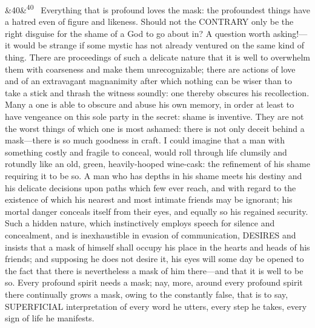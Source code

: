 \documentclass[12pt]{article}
\newcommand{\para}[1][]{\par\noindent\ifx&#1&\else\textsuperscript{\footnotesize #1}~\fi}
\begin{document}
\para[40] Everything that is profound loves the mask: the profoundest things have a hatred even of figure and likeness. Should not the CONTRARY only be the right disguise for the shame of a God to go about in? A question worth asking!---it would be strange if some mystic has not already ventured on the same kind of thing. There are proceedings of such a delicate nature that it is well to overwhelm them with coarseness and make them unrecognizable; there are actions of love and of an extravagant magnanimity after which nothing can be wiser than to take a stick and thrash the witness soundly: one thereby obscures his recollection. Many a one is able to obscure and abuse his own memory, in order at least to have vengeance on this sole party in the secret: shame is inventive. They are not the worst things of which one is most ashamed: there is not only deceit behind a mask---there is so much goodness in craft. I could imagine that a man with something costly and fragile to conceal, would roll through life clumsily and rotundly like an old, green, heavily-hooped wine-cask: the refinement of his shame requiring it to be so. A man who has depths in his shame meets his destiny and his delicate decisions upon paths which few ever reach, and with regard to the existence of which his nearest and most intimate friends may be ignorant; his mortal danger conceals itself from their eyes, and equally so his regained security. Such a hidden nature, which instinctively employs speech for silence and concealment, and is inexhaustible in evasion of communication, DESIRES and insists that a mask of himself shall occupy his place in the hearts and heads of his friends; and supposing he does not desire it, his eyes will some day be opened to the fact that there is nevertheless a mask of him there---and that it is well to be so. Every profound spirit needs a mask; nay, more, around every profound spirit there continually grows a mask, owing to the constantly false, that is to say, SUPERFICIAL interpretation of every word he utters, every step he takes, every sign of life he manifests.
\end{document}
